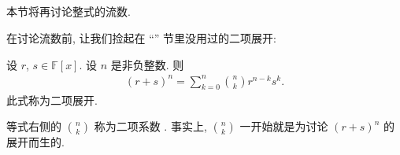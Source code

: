 \subsection*{\FluxionsRevisited}
\markright{\FluxionsRevisited}

本节将再讨论整式的流数.

在讨论流数前, 让我们捡起在 ``\GeneralizedBinomialCoefficients'' 节里没用过的二项展开:

\begin{proposition}
    设 $r$, $s \in \mathbb{F}[x]$. 设 $n$ 是非负整数. 则
    \begin{align*}
        (r + s)^{n} = \sum_{k = 0}^{n} \binom{n}{k} r^{n - k} s^{k}.
    \end{align*}
    此式称为二项展开.
\end{proposition}

\begin{remark}
    等式右侧的 $\binom{n}{k}$ 称为二项系数 . 事实上, $\binom{n}{k}$ 一开始就是为讨论 $(r+s)^n$ 的展开而生的.
\end{remark}

